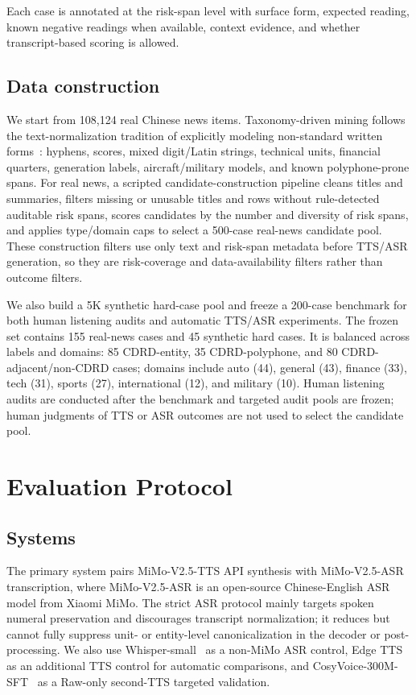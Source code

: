 \documentclass{article}
\begin{document}
Each case is annotated at the risk-span level with surface form, expected reading, known negative readings when available, context evidence, and whether transcript-based scoring is allowed.

\subsection{Data construction}

We start from 108,124 real Chinese news items. Taxonomy-driven mining follows the text-normalization tradition of explicitly modeling non-standard written forms~\cite{sproat2001normalization,ebden2015kestrel}: hyphens, scores, mixed digit/Latin strings, technical units, financial quarters, generation labels, aircraft/military models, and known polyphone-prone spans. For real news, a scripted candidate-construction pipeline cleans titles and summaries, filters missing or unusable titles and rows without rule-detected auditable risk spans, scores candidates by the number and diversity of risk spans, and applies type/domain caps to select a 500-case real-news candidate pool. These construction filters use only text and risk-span metadata before TTS/ASR generation, so they are risk-coverage and data-availability filters rather than outcome filters.

We also build a 5K synthetic hard-case pool and freeze a 200-case benchmark for both human listening audits and automatic TTS/ASR experiments. The frozen set contains 155 real-news cases and 45 synthetic hard cases. It is balanced across labels and domains: 85 CDRD-entity, 35 CDRD-polyphone, and 80 CDRD-adjacent/non-CDRD cases; domains include auto (44), general (43), finance (33), tech (31), sports (27), international (12), and military (10). Human listening audits are conducted after the benchmark and targeted audit pools are frozen; human judgments of TTS or ASR outcomes are not used to select the candidate pool.

\section{Evaluation Protocol}

\subsection{Systems}

The primary system pairs MiMo-V2.5-TTS API synthesis with MiMo-V2.5-ASR transcription, where MiMo-V2.5-ASR is an open-source Chinese-English ASR model from Xiaomi MiMo. The strict ASR protocol mainly targets spoken numeral preservation and discourages transcript normalization; it reduces but cannot fully suppress unit- or entity-level canonicalization in the decoder or post-processing. We also use Whisper-small~\cite{radford2023whisper} as a non-MiMo ASR control, Edge TTS as an additional TTS control for automatic comparisons, and CosyVoice-300M-SFT~\cite{du2024cosyvoice} as a Raw-only second-TTS targeted validation.
\end{document}
